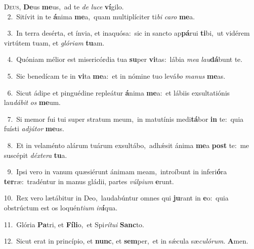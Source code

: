 \lettrine{\initial\textcolor{\initialcolor}{D}}{eus,} \textbf{De}\-us \textbf{me}\-us,~\star ad te \textit{de} \textit{lu}\-\textit{ce} \textbf{ví}\-gilo.\\
{\numbfont\textcolor{\numbcolor}{~2.}}~Sitívit in te \textbf{á}\-nima \textbf{me}\-a,~\star quam multiplíciter ti\textit{bi} \textit{ca}\-\textit{ro} \textbf{me}\-a.\par
{\numbfont\textcolor{\numbcolor}{~3.}}~In terra desérta, et ínvia, et inaquósa:~\dagger sic in sancto ap\-\textbf{pá}\-rui \textbf{ti}\-bi,~\star ut vidérem virtútem tuam, et \textit{gló}\-\textit{ri}\textit{am} \textbf{tu}\-am.\par
{\numbfont\textcolor{\numbcolor}{~4.}}~Quóniam mélior est misericórdia tua \textbf{su}\-per \textbf{vi}\-tas:~\star lábia \textit{me}\-\textit{a} \textit{lau}\-\textbf{dá}bunt te.\par
{\numbfont\textcolor{\numbcolor}{~5.}}~Sic benedícam te in \textbf{vi}\-ta \textbf{me}\-a:~\star et in nómine tuo levá\textit{bo} \textit{ma}\-\textit{nus} \textbf{me}\-as.\par
{\numbfont\textcolor{\numbcolor}{~6.}}~Sicut ádipe et pinguédine repleátur \textbf{á}\-nima \textbf{me}\-a:~\star et lábiis exsultatiónis lau\-\textit{dá}\-\textit{bit} \textit{os} \textbf{me}\-um.\par
{\numbfont\textcolor{\numbcolor}{~7.}}~Si memor fui tui super stratum meum,~\dagger in matutínis medi\-\textbf{tá}\-bor \textbf{in} te:~\star quia fuísti \textit{ad}\-\textit{jú}\textit{tor} \textbf{me}\-us.\par
{\numbfont\textcolor{\numbcolor}{~8.}}~Et in velaménto alárum tuárum exsultábo,~\dagger adhǽsit ánima \textbf{me}\-a \textbf{post} te:~\star me suscépit \textit{déx}\-\textit{te}\textit{ra} \textbf{tu}\-a.\par
{\numbfont\textcolor{\numbcolor}{~9.}}~Ipsi vero in vanum quæsiérunt ánimam meam,~\dagger introíbunt in inferi\-\textbf{ó}\-ra \textbf{ter}\-ræ:~\star tradéntur in manus gládii, partes \textit{vúl}\-\textit{pi}\textit{um} \textbf{e}\-runt.\par
{\numbfont\textcolor{\numbcolor}{10.}}~Rex vero lætábitur in Deo,~\dagger laudabúntur omnes qui \textbf{ju}\-rant in \textbf{e}\-o:~\star quia obstrúctum est os loquén\-\textit{ti}\-\textit{um} \textit{in}\-\textbf{í}qua.\par
{\numbfont\textcolor{\numbcolor}{11.}}~Glória \textbf{Pa}\-tri, et \textbf{Fí}\-\textbf{li}o,~\star et Spi\-\textit{rí}\-\textit{tu}\textit{i} \textbf{Sanc}\-to.\par
{\numbfont\textcolor{\numbcolor}{12.}}~Sicut erat in princípio, et \textbf{nunc}\-, et \textbf{sem}\-per,~\star et in sǽcula sæ\-\textit{cu}\-\textit{ló}\textit{rum}. \textbf{A}\-men.\par
